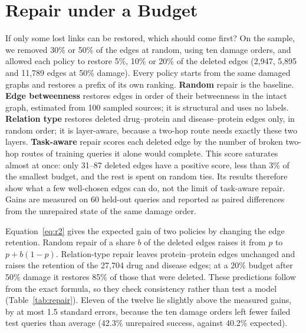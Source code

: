 \section{Repair under a Budget}
\label{sec:repair}

If only some lost links can be restored, which should come first? On the
sample, we removed 30\% or 50\% of the edges at random, using ten damage
orders, and allowed each policy to restore 5\%, 10\% or 20\% of the deleted
edges (2,947, 5,895 and 11,789 edges at 50\% damage). Every policy starts from
the same damaged graphs and restores a prefix of its own ranking. \textbf{Random}
repair is the baseline. \textbf{Edge betweenness} restores edges in order of
their betweenness in the intact graph, estimated from 100 sampled sources; it is
structural and uses no labels. \textbf{Relation type} restores deleted
drug--protein and disease--protein edges only, in random order; it is
layer-aware, because a two-hop route needs exactly these two layers.
\textbf{Task-aware} repair scores each deleted edge by the number of broken
two-hop routes of training queries it alone would complete. This score
saturates almost at once: only 31--87 deleted edges have a positive score, less
than 3\% of the smallest budget, and the rest is spent on random ties. Its
results therefore show what a few well-chosen edges can do, not the limit of
task-aware repair. Gains are measured on 60 held-out queries and reported as
paired differences from the unrepaired state of the same damage order.

Equation~\eqref{eq:r2} gives the expected gain of two policies by changing the
edge retention. Random repair of a share $b$ of the deleted edges raises it from
$p$ to $p+b(1-p)$. Relation-type repair leaves protein--protein edges
unchanged and raises the retention of the 27,704 drug and disease edges; at a
20\% budget after 50\% damage it restores 85\% of those that were deleted. These
predictions follow from the exact formula, so they check consistency rather
than test a model (Table~\ref{tab:repair}). Eleven of the twelve lie slightly
above the measured gains, by at most 1.5 standard errors, because the ten damage
orders left fewer failed test queries than average (42.3\% unrepaired success,
against 40.2\% expected).

